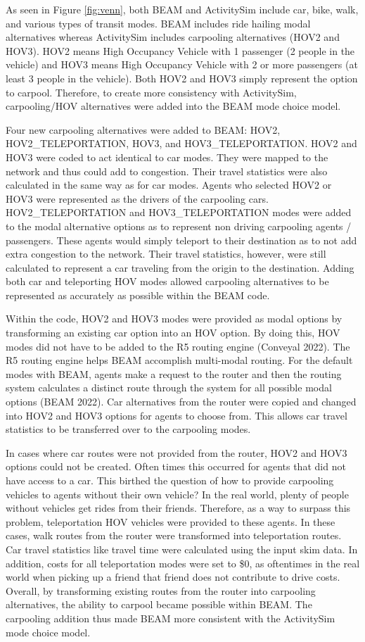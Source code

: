 \documentclass[12pt, oneside, openright]{byuthesis}
\begin{document}
As seen in Figure \ref{fig:venn}, both BEAM and ActivitySim include car, bike, walk, and various types of transit modes. BEAM includes ride hailing modal alternatives whereas ActivitySim includes carpooling alternatives (HOV2 and HOV3). HOV2 means High Occupancy Vehicle with 1 passenger (2 people in the vehicle) and HOV3 means High Occupancy Vehicle with 2 or more passengers (at least 3 people in the vehicle). Both HOV2 and HOV3 simply represent the option to carpool. Therefore, to create more consistency with ActivitySim, carpooling/HOV alternatives were added into the BEAM mode choice model.

Four new carpooling alternatives were added to BEAM: HOV2, HOV2\_TELEPORTATION, HOV3, and HOV3\_TELEPORTATION. HOV2 and HOV3 were coded to act identical to car modes. They were mapped to the network and thus could add to congestion. Their travel statistics were also calculated in the same way as for car modes. Agents who selected HOV2 or HOV3 were represented as the drivers of the carpooling cars. HOV2\_TELEPORTATION and HOV3\_TELEPORTATION modes were added to the modal alternative options as to represent non driving carpooling agents / passengers. These agents would simply teleport to their destination as to not add extra congestion to the network. Their travel statistics, however, were still calculated to represent a car traveling from the origin to the destination. Adding both car and teleporting HOV modes allowed carpooling alternatives to be represented as accurately as possible within the BEAM code.

Within the code, HOV2 and HOV3 modes were provided as modal options by transforming an existing car option into an HOV option. By doing this, HOV modes did not have to be added to the R5 routing engine (Conveyal 2022). The R5 routing engine helps BEAM accomplish multi-modal routing. For the default modes with BEAM, agents make a request to the router and then the routing system calculates a distinct route through the system for all possible modal options (BEAM 2022). Car alternatives from the router were copied and changed into HOV2 and HOV3 options for agents to choose from. This allows car travel statistics to be transferred over to the carpooling modes.

In cases where car routes were not provided from the router, HOV2 and HOV3 options could not be created. Often times this occurred for agents that did not have access to a car. This birthed the question of how to provide carpooling vehicles to agents without their own vehicle? In the real world, plenty of people without vehicles get rides from their friends. Therefore, as a way to surpass this problem, teleportation HOV vehicles were provided to these agents. In these cases, walk routes from the router were transformed into teleportation routes. Car travel statistics like travel time were calculated using the input skim data. In addition, costs for all teleportation modes were set to \$0, as oftentimes in the real world when picking up a friend that friend does not contribute to drive costs. Overall, by transforming existing routes from the router into carpooling alternatives, the ability to carpool became possible within BEAM. The carpooling addition thus made BEAM more consistent with the ActivitySim mode choice model.
\end{document}
